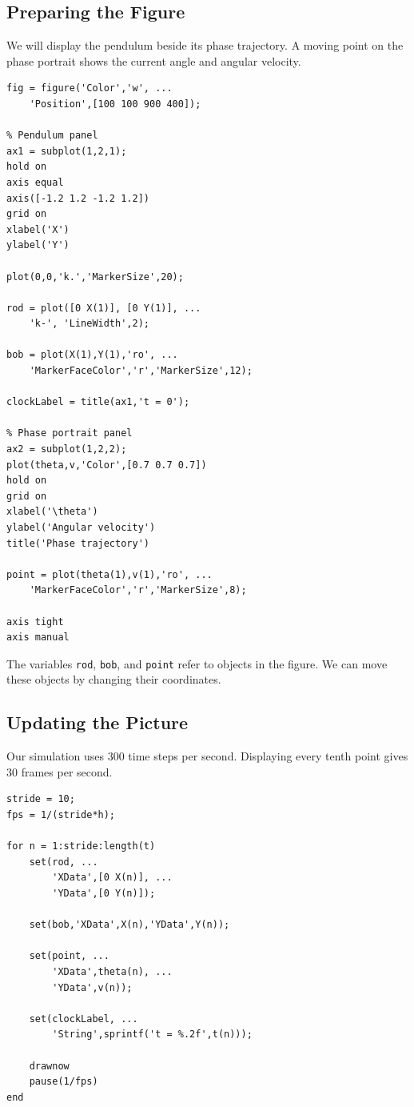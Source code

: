 \documentclass[10pt,letterpaper]{article}
\begin{document}
\subsection{Preparing the Figure}

We will display the pendulum beside its phase trajectory.
A moving point on the phase portrait shows the
current angle and angular velocity.

\begin{lstlisting}[style=lecturematlab]
fig = figure('Color','w', ...
    'Position',[100 100 900 400]);

% Pendulum panel
ax1 = subplot(1,2,1);
hold on
axis equal
axis([-1.2 1.2 -1.2 1.2])
grid on
xlabel('X')
ylabel('Y')

plot(0,0,'k.','MarkerSize',20);

rod = plot([0 X(1)], [0 Y(1)], ...
    'k-', 'LineWidth',2);

bob = plot(X(1),Y(1),'ro', ...
    'MarkerFaceColor','r','MarkerSize',12);

clockLabel = title(ax1,'t = 0');

% Phase portrait panel
ax2 = subplot(1,2,2);
plot(theta,v,'Color',[0.7 0.7 0.7])
hold on
grid on
xlabel('\theta')
ylabel('Angular velocity')
title('Phase trajectory')

point = plot(theta(1),v(1),'ro', ...
    'MarkerFaceColor','r','MarkerSize',8);

axis tight
axis manual
\end{lstlisting}

The variables \texttt{rod}, \texttt{bob}, and
\texttt{point} refer to objects in the figure.
We can move these objects by changing their coordinates.

\subsection{Updating the Picture}

Our simulation uses $300$ time steps per second.
Displaying every tenth point gives $30$ frames
per second.

\begin{lstlisting}[style=lecturematlab]
stride = 10;
fps = 1/(stride*h);

for n = 1:stride:length(t)
    set(rod, ...
        'XData',[0 X(n)], ...
        'YData',[0 Y(n)]);

    set(bob,'XData',X(n),'YData',Y(n));

    set(point, ...
        'XData',theta(n), ...
        'YData',v(n));

    set(clockLabel, ...
        'String',sprintf('t = %.2f',t(n)));

    drawnow
    pause(1/fps)
end
\end{lstlisting}
\end{document}
